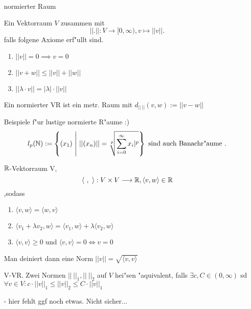 \documentclass[class=article, crop=false]{standalone}
\begin{document}
\begin{zettel}{normierter Raum}
\begin{flashcard}
    \begin{definition}
        Ein Vektorraum $V$ zusammen mit     
        \[
            || . ||: V \longrightarrow [0, \infty), v \mapsto  ||v||
        .\]
        falls folgene Axiome erf"ullt sind.
        \begin{enumerate}
            \item $||v|| = 0 \implies v = 0 $ 
            \item $||v + w || \leq  ||v|| + ||w||$ 
            \item $||\lambda \cdot v|| = |\lambda | \cdot ||v||$ 
        \end{enumerate}
    \end{definition}
    Ein normierter VR ist ein metr. Raum mit $ d_{ ||\ ||} (v,w) := ||v -w||$ 
\end{flashcard}

\begin{remark}
Beispiele f"ur lustige normierte R"aume :)
\[
    l_p (\mathbb{N}) := \set{ (x_1 )}{ ||(x_n)|| = \sqrt[p]{\sum_{i=0}^{\infty} 
    x_i|^p}  } \text{ sind auch Banachr"aume } 
.\]

\begin{example}[Hilbertraum?]
    $\mathbb{R}$-Vektorraum V,
    \[
        \langle \ , \ \rangle : V \times V \longrightarrow \mathbb{R}, \langle v,w\rangle \in  \mathbb{R}
    \] ,sodass 
    \begin{enumerate}
        \item $ \langle v,w\rangle  =  \langle w,v\rangle $ 
        \item $ \langle v_1+\lambda v_2,w\rangle =  \langle v_1 ,w\rangle  + \lambda \langle v_2,w\rangle $ 
        \item $ \langle v,v\rangle \geq 0$ und $ \langle v,v\rangle = 0 \iff  v = 0$ 
        
    \end{enumerate}
    Man deiniert dann eine Norm $||v|| = \sqrt{ \langle v,v\rangle }$ 
        
\end{example}
\end{remark}

\begin{definition}
    V-VR. Zwei Normen $||\ ||_1, ||\ ||_2 $ auf $V$ hei"sen "aquivalent, falls $\exists c, C \in  (0,\infty) $ sd
    $\forall  v \in  V : c \cdot  ||v||_1 \leq ||v||_2 \leq C \cdot ||v||_1$ 

    - hier fehlt ggf noch etwas. Nicht sicher...
\end{definition}
\end{zettel}
\end{document}
